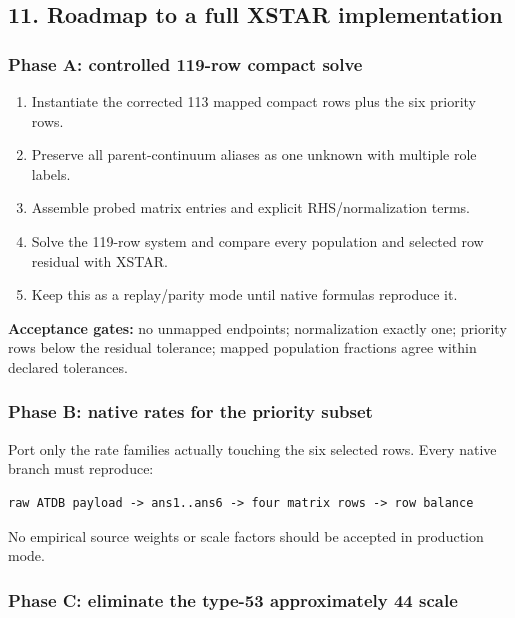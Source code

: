 \documentclass[
  10pt,
]{article}
\providecommand{\tightlist}{%
  \setlength{\itemsep}{0pt}\setlength{\parskip}{0pt}}
\begin{document}
\subsection{11. Roadmap to a full XSTAR
implementation}\label{roadmap-to-a-full-xstar-implementation}

\subsubsection{Phase A: controlled 119-row compact
solve}\label{phase-a-controlled-119-row-compact-solve}

\begin{enumerate}
\def\labelenumi{\arabic{enumi}.}
\tightlist
\item
  Instantiate the corrected 113 mapped compact rows plus the six
  priority rows.
\item
  Preserve all parent-continuum aliases as one unknown with multiple
  role labels.
\item
  Assemble probed matrix entries and explicit RHS/normalization terms.
\item
  Solve the 119-row system and compare every population and selected row
  residual with XSTAR.
\item
  Keep this as a replay/parity mode until native formulas reproduce it.
\end{enumerate}

\textbf{Acceptance gates:} no unmapped endpoints; normalization exactly
one; priority rows below the residual tolerance; mapped population
fractions agree within declared tolerances.

\subsubsection{Phase B: native rates for the priority
subset}\label{phase-b-native-rates-for-the-priority-subset}

Port only the rate families actually touching the six selected rows.
Every native branch must reproduce:

\begin{lstlisting}
raw ATDB payload -> ans1..ans6 -> four matrix rows -> row balance
\end{lstlisting}

No empirical source weights or scale factors should be accepted in
production mode.

\subsubsection{Phase C: eliminate the type-53 approximately 44
scale}\label{phase-c-eliminate-the-type-53-approximately-44-scale}
\end{document}
